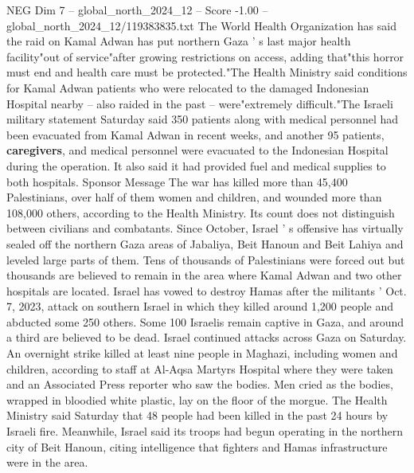 \begin{textsample}{NEG Dim 7 – global\_north\_2024\_12 – Score -1.00 – global\_north\_2024\_12/119383835.txt}
The World Health Organization has said the raid on Kamal Adwan has put northern Gaza ' s last major health facility"out of service"after growing restrictions on access, adding that"this horror must end and health care must be protected."The Health Ministry said conditions for Kamal Adwan patients who were relocated to the damaged Indonesian Hospital nearby -- also raided in the past -- were"extremely difficult."The Israeli military statement Saturday said 350 patients along with medical personnel had been evacuated from Kamal Adwan in recent weeks, and another 95 patients, \textbf{caregivers}, and medical personnel were evacuated to the Indonesian Hospital during the operation.
It also said it had provided fuel and medical supplies to both hospitals.
Sponsor Message The war has killed more than 45,400 Palestinians, over half of them women and children, and wounded more than 108,000 others, according to the Health Ministry.
Its count does not distinguish between civilians and combatants.
Since October, Israel ' s offensive has virtually sealed off the northern Gaza areas of Jabaliya, Beit Hanoun and Beit Lahiya and leveled large parts of them.
Tens of thousands of Palestinians were forced out but thousands are believed to remain in the area where Kamal Adwan and two other hospitals are located.
Israel has vowed to destroy Hamas after the militants ' Oct. 7, 2023, attack on southern Israel in which they killed around 1,200 people and abducted some 250 others.
Some 100 Israelis remain captive in Gaza, and around a third are believed to be dead.
Israel continued attacks across Gaza on Saturday.
An overnight strike killed at least nine people in Maghazi, including women and children, according to staff at Al-Aqsa Martyrs Hospital where they were taken and an Associated Press reporter who saw the bodies.
Men cried as the bodies, wrapped in bloodied white plastic, lay on the floor of the morgue.
The Health Ministry said Saturday that 48 people had been killed in the past 24 hours by Israeli fire.
Meanwhile, Israel said its troops had begun operating in the northern city of Beit Hanoun, citing intelligence that fighters and Hamas infrastructure were in the area.

\end{textsample}
